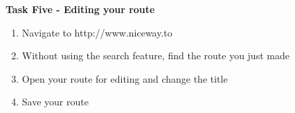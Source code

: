 \begin{Large}\noindent\textbf{Task Five - Editing your route}\end{Large}
\begin{enumerate}
	\item Navigate to http://www.niceway.to
	\item Without using the search feature, find the route you just made
	\item Open your route for editing and change the title
	\item Save your route
\end{enumerate}